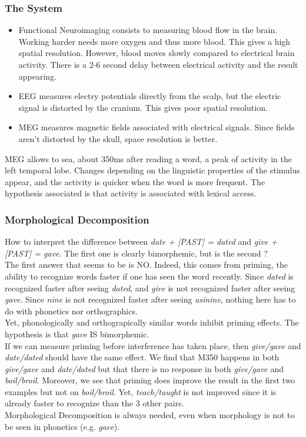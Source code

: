 \documentclass{cours}
\begin{document}
\subsubsection{The System}
\begin{itemize}
    \item Functional Neuroimaging consists to measuring blood flow in the brain. Working harder needs more oxygen and thus more blood. This gives a high spatial resolution. However, blood moves slowly compared to electrical brain activity. There is a 2-6 second delay between electrical activity and the result appearing.
    \item EEG measures electry potentials directly from the scalp, but the electric signal is distorted by the cranium. This gives poor spatial resolution. 
    \item MEG measures magnetic fields associated with electrical signals. Since fields aren't distorted by the skull, space resolution is better. 
\end{itemize}
MEG allows to sea, about 350ms after reading a word, a peak of activity in the left temporal lobe. Changes depending on the linguistic properties of the stimulus appear, and the activity is quicker when the word is more frequent. The hypothesis associated is that activity is associated with lexical access. 

\subsubsection{Morphological Decomposition}
How to interpret the difference between \textsl{date + [PAST] = dated} and \textsl{give + [PAST] = gave}. The first one is clearly bimorphemic, but is the second ? \\
The first answer that seems to be is NO. Indeed, this comes from priming, the ability to recognize words faster if one has seen the word recently. Since \textsl{dated} is recognized faster after seeing \textsl{dated}, and \textsl{give} is not recognized faster after seeing \textsl{gave}. Since \textsl{nine} is not recognized faster after seeing \textsl{asinine}, nothing here has to do with phonetics nor orthographics. \\
Yet, phonologically and orthograpically similar words inhibit priming effects. The hypothesis is that \textsl{gave} IS bimorphemic. \\
If we can measure priming before interference has taken place, then \textsl{give/gave} and \textsl{date/dated} should have the same effect. We find that M350 happens in both \textsl{give/gave} and \textsl{date/dated} but that there is no response in both \textsl{give/gave} and \textsl{boil/broil}. Moreover, we see that priming does improve the result in the first two examples but not on \textsl{boil/broil}. Yet, \textsl{teach/taught} is not improved since it is already faster to recognize than the 3 other pairs. \\
Morphological Decomposition is always needed, even when morphology is not to be seen in phonetics (e.g. \textsl{gave}).
\end{document}
